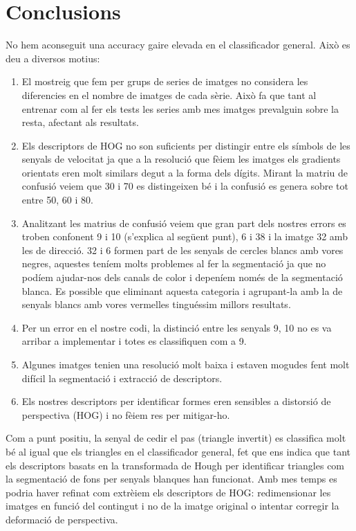 
\section{Conclusions}

No hem aconseguit una accuracy gaire elevada en el classificador general. Això es deu a diversos motius:

\begin{enumerate}
    \item El mostreig que fem per grups de series de imatges no considera les diferencies en el
        nombre de imatges de cada sèrie. Això fa que tant al entrenar com al fer els tests les series
        amb mes imatges prevalguin sobre la resta, afectant als resultats.
    \item Els descriptors de HOG no son suficients per distingir entre els símbols de les senyals de
        velocitat ja que a la resolució que fèiem les imatges els gradients orientats eren molt similars
        degut a la forma dels dígits. Mirant la matriu de confusió veiem que 30 i 70 es distingeixen bé i
        la confusió es genera sobre tot entre 50, 60 i 80.
    \item Analitzant les matrius de confusió veiem que gran part dels nostres errors es troben confonent
        9 i 10 (s'explica al següent punt), 6 i 38 i la imatge 32 amb les de direcció. 32 i 6 formen part de les
        senyals de cercles blancs amb vores negres, aquestes teníem molts problemes al fer la segmentació ja que
        no podíem ajudar-nos dels canals de color i depeníem només de la segmentació blanca. Es possible que eliminant
        aquesta categoria i agrupant-la amb la de senyals blancs amb vores vermelles tinguéssim millors resultats.
    \item Per un error en el nostre codi, la distinció entre les senyals 9, 10 no es va arribar a implementar
        i totes es classifiquen com a 9.
    \item Algunes imatges tenien una resolució molt baixa i estaven mogudes fent molt difícil la segmentació i
        extracció de descriptors.
    \item Els nostres descriptors per identificar formes eren sensibles a distorsió de perspectiva (HOG) i no
        fèiem res per mitigar-ho.
\end{enumerate}

Com a punt positiu, la senyal de cedir el pas (triangle invertit) es classifica molt bé al igual que els triangles
en el classificador general, fet que ens indica que tant els descriptors basats en la transformada de Hough per
identificar triangles com la segmentació de fons per senyals blanques han funcionat. Amb mes temps es podria haver
refinat com extrèiem els descriptors de HOG: redimensionar les imatges en funció del contingut i no de la imatge original
o intentar corregir la deformació de perspectiva.
